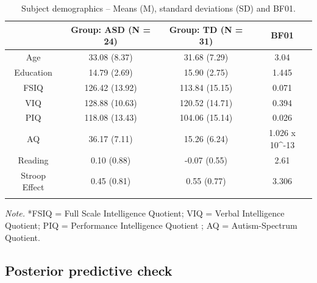 \documentclass[
  11pt,
  english,
  ,doc,floatsintext]{apa6}
\begin{document}
\begin{table}[htb]

\begin{center}
\begin{threeparttable}

\caption{\label{tab:demoWO}Subject demographics – Means (M), standard deviations (SD) and BF01.}

\begin{tabular}{cccc}
\toprule
 & \multicolumn{1}{c}{Group: ASD (N = 24)} & \multicolumn{1}{c}{Group: TD (N = 31)} & \multicolumn{1}{c}{BF01}\\
\midrule
Age & 33.08 (8.37) & 31.68 (7.29) & 3.04\\
Education & 14.79 (2.69) & 15.90 (2.75) & 1.445\\
FSIQ & 126.42 (13.92) & 113.84 (15.15) & 0.071\\
VIQ & 128.88 (10.63) & 120.52 (14.71) & 0.394\\
PIQ & 118.08 (13.43) & 104.06 (15.14) & 0.026\\
AQ & 36.17 (7.11) & 15.26 (6.24) & 1.026 x 10\textasciicircum{}-13\\
Reading & 0.10 (0.88) & -0.07 (0.55) & 2.61\\
Stroop Effect & 0.45 (0.81) & 0.55 (0.77) & 3.306\\
\bottomrule
\addlinespace
\end{tabular}

\begin{tablenotes}[para]
\normalsize{\textit{Note.} *FSIQ = Full Scale Intelligence Quotient; VIQ = Verbal Intelligence Quotient; PIQ = Performance Intelligence Quotient ; AQ = Autism-Spectrum Quotient.}
\end{tablenotes}

\end{threeparttable}
\end{center}

\end{table}

\hypertarget{posterior-predictive-check-1}{%
\subsection{Posterior predictive check}\label{posterior-predictive-check-1}}
\end{document}
